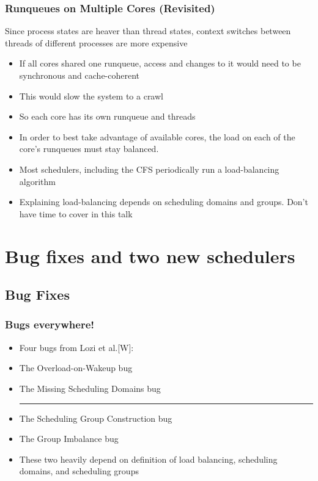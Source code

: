 \documentclass{beamer}
\newcommand{\linespace}{\vskip 0.25cm}
\begin{document}
\begin{frame}
\frametitle{Runqueues on Multiple Cores (Revisited)}

Since process states are heaver than thread states, context switches between threads of different processes are more expensive

\linespace

\begin{itemize}
	\item If all cores shared one runqueue, access and changes to it would need to be synchronous and cache-coherent
	\item This would slow the system to a crawl
	\item So each core has its own runqueue and threads
\end{itemize}

\linespace

\begin{itemize}
\item In order to best take advantage of available cores, the load on each of the core's runqueues must stay balanced.
\item Most schedulers, including the CFS periodically run a load-balancing algorithm
\item Explaining load-balancing depends on scheduling domains and groups. Don't have time to cover in this talk
\end{itemize}
\end{frame}

\section[Bug Fixes and New Schedulers]{Bug fixes and two new schedulers}
\subsection{Bug Fixes}
\begin{frame}
\frametitle{Bugs everywhere!}

\begin{itemize}
	\item[] Four bugs from Lozi et al.[W]:
	\item The Overload-on-Wakeup bug
	\item The Missing Scheduling Domains bug
	
	\linespace	
	\noindent\rule{4cm}{0.4pt}
	\linespace	
	
	\item The Scheduling Group Construction bug
	\item The Group Imbalance bug

	\linespace
	
\item[] These two heavily depend on definition of load balancing, scheduling domains, and scheduling groups
	
\end{itemize}

\end{frame}
\end{document}
